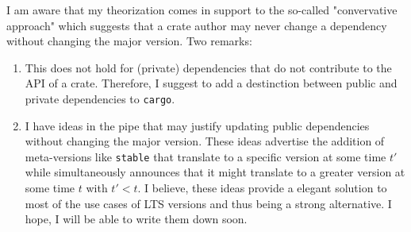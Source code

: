 \documentclass{article}
\begin{document}
    I am aware that my theorization comes in support to the so-called "convervative approach" which suggests that a crate author may never change a dependency without changing the major version. Two remarks:
    \begin{enumerate}
        \item This does not hold for (private) dependencies that do not contribute to the API of a crate. Therefore, I suggest to add a destinction between public and private dependencies to \texttt{cargo}.
        \item I have ideas in the pipe that may justify updating public dependencies without changing the major version. These ideas advertise the addition of meta-versions like \texttt{stable} that translate to a specific version at some time $t'$ while simultaneously announces that it might translate to a greater version at some time $t$ with $t' < t$. I believe, these ideas provide a elegant solution to most of the use cases of LTS versions and thus being a strong alternative. I hope, I will be able to write them down soon.
    \end{enumerate}
\end{document}
